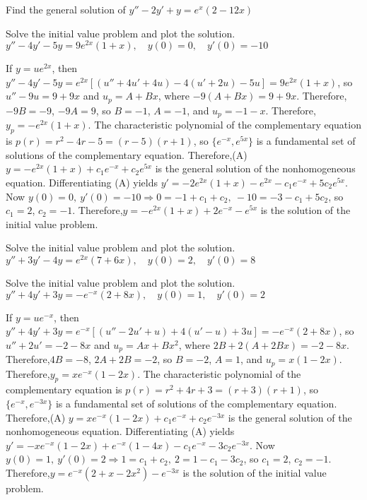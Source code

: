 \documentclass{ximera}
\begin{document}
\begin{problem}\label{exer:5.4.19} Find the general
solution of $y''-2y'+y=e^x(2-12x)$
\end{problem}

\begin{problem}\label{exer:5.4.20} Solve the
initial value problem and plot the solution. $y''-4y'-5y=9e^{2x}(1+x), \quad  y(0)=0,\quad y'(0)=-10$
\begin{solution}
If $y=ue^{2x}$, then
$y''-4y'-5y=e^{2x}\left[(u''+4u'+4u)-4(u'+2u)-5u\right]=
9e^{2x}(1+x)$, so $u''-9u =9+9x$ and $u_p=A+Bx$, where
$-9(A+Bx)=9+9x$. Therefore,$-9B=-9$, $-9A=9$, so $B=-1$, $A=-1$, and
$u_p=-1-x$. Therefore,$y_p=-e^{2x}(1+x)$. The characteristic
polynomial of the complementary equation is
$p(r)=r^2-4r-5=(r-5)(r+1)$, so $\{e^{-x},e^{5x}\}$ is a fundamental
set of solutions of the complementary equation. Therefore,(A)
$y=-e^{2x}(1+x)+c_1e^{-x}+c_2e^{5x}$ is the general solution of the
nonhomogeneous equation. Differentiating (A) yields
$y'=-2e^{2x}(1+x)-e^{2x}-c_1e^{-x}+5c_2e^{5x}$. Now $y(0)=0,\
y'(0)=-10\Rightarrow 0=-1+c_1+c_2,\ -10=-3-c_1+5c_2$, so $c_1=2$,
$c_2=-1$. Therefore,$y=-e^{2x}(1+x)+2e^{-x}-e^{5x}$ is the solution of
the initial value problem.
\end{solution}
\end{problem}

\begin{problem}\label{exer:5.4.21} Solve the
initial value problem and plot the solution. $y''+3y'-4y=e^{2x}(7+6x), \quad  y(0)=2,\quad y'(0)=8$
\end{problem}

\begin{problem}\label{exer:5.4.22} Solve the
initial value problem and plot the solution. 
$y''+4y'+3y=-e^{-x}(2+8x), \quad  y(0)=1,\quad y'(0)=2$
\begin{solution}
If $y=ue^{-x}$, then
$y''+4y'+3y=e^{-x}\left[(u''-2u'+u)+4(u'-u)+3u\right]= -e^{-x}(2+8x)$,
so $u''+2u'=-2-8x$ and $u_p=Ax+Bx^2$, where $2B+2(A+2Bx)=-2-8x$.
Therefore,$4B=-8$, $2A+2B=-2$, so $B=-2$, $A=1$, and $u_p=x(1-2x)$.
Therefore,$y_p=xe^{-x}(1-2x)$. The characteristic polynomial of the
complementary equation is $p(r)=r^2+4r+3=(r+3)(r+1)$, so
$\{e^{-x},e^{-3x}\}$ is a fundamental set of solutions of the
complementary equation. Therefore,(A)
$y=xe^{-x}(1-2x)+c_1e^{-x}+c_2e^{-3x}$ is the general solution of the
nonhomogeneous equation. Differentiating (A) yields
$y'=-xe^{-x}(1-2x)+e^{-x}(1-4x)-c_1e^{-x}-3c_2e^{-3x}$. Now $y(0)=1,\
y'(0)=2\Rightarrow 1=c_1+c_2,\ 2=1-c_1-3c_2$, so $c_1=2$, $c_2=-1$.
Therefore,$y=e^{-x}(2+x-2x^2)-e^{-3x}$ is the solution of the initial
value problem.
\end{solution}
\end{problem}
\end{document}
